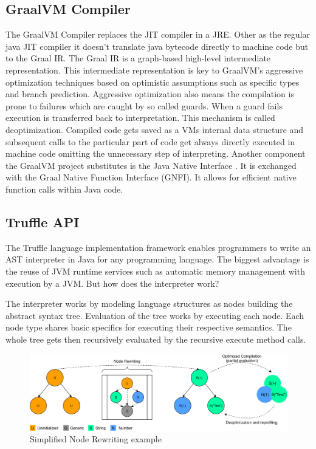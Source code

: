 \subsection{GraalVM Compiler}\label{sec:graalcomp}
The GraalVM Compiler replaces the JIT compiler in a JRE. Other as the regular java JIT compiler it doesn't translate java bytecode directly to machine code but to the Graal IR. \cite{inproceedings} The Graal IR is a graph-based high-level intermediate representation. This intermediate representation is key to GraalVM's aggressive optimization techniques based on optimistic assumptions such as specific types and branch prediction. Aggressive optimization also means the compilation is prone to failures which are caught by so called guards. When a guard fails execution is transferred back to interpretation. This mechanism is called deoptimization. \cite{ChambDeopt} Compiled code gets saved as a VMs internal data structure and subsequent calls to the particular part of code get always directly executed in machine code omitting the unnecessary step of interpreting. Another component the GraalVM project substitutes is the Java Native Interface \cite{Lindholm}. It is exchanged with the Graal Native Function Interface (GNFI). \cite{grimmerNative} It allows for efficient native function calls within Java code.
\subsection{Truffle API}
The Truffle language implementation framework enables programmers to write an AST interpreter in Java for any programming language. The biggest advantage is the reuse of JVM runtime services such as automatic memory management with execution by a JVM. But how does the interpreter work?

The interpreter works by modeling language structures as nodes building the abstract syntax tree. Evaluation of the tree works by executing each node. Each node type shares basic specifics for executing their respective semantics. The whole tree gets then recursively evaluated by the recursive execute method calls.

\begin{figure}[h!]
    \centering
    \includegraphics[scale=0.7]{figures/NodeJIT.png}
    \caption{Simplified Node Rewriting example}
    \label{fig:trufNR}
\end{figure}

